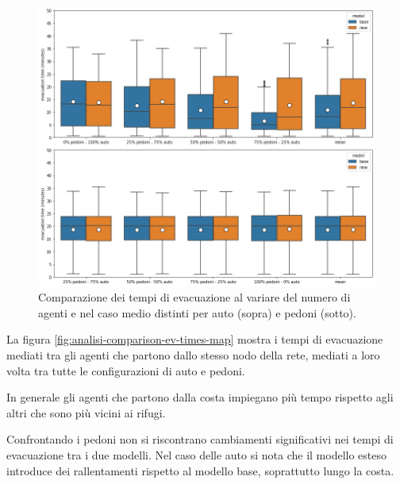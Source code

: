 \begin{figure}[ht]
    \centering
    \includegraphics[width=\textwidth]{images/analisi/comparison-evtimes2.png}
    \caption{
        Comparazione dei tempi di evacuazione al variare del numero di agenti e nel caso medio distinti per auto (sopra) e pedoni (sotto).
    }
    \label{fig:analisi-comparison-evtimes2}
\end{figure}

\pagebreak

La figura \ref{fig:analisi-comparison-ev-times-map} mostra i tempi di evacuazione mediati tra gli agenti che partono dallo stesso nodo della rete,
mediati a loro volta tra tutte le configurazioni di auto e pedoni.

In generale gli agenti che partono dalla costa impiegano più tempo rispetto agli altri che sono più vicini ai rifugi.

Confrontando i pedoni non si riscontrano cambiamenti significativi nei tempi di evacuazione tra i due modelli.
Nel caso delle auto si nota che il modello esteso introduce dei rallentamenti rispetto al modello base, 
soprattutto lungo la costa.


